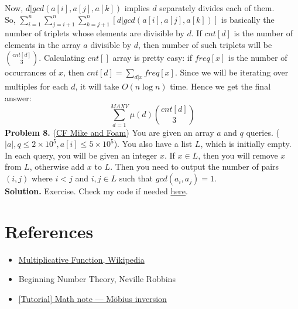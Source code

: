 \documentclass[11pt]{article}
\begin{document}
Now, $d | gcd(a[i], a[j], a[k])$ implies $d$ separately divides each of them.\\ So, $\sum_{i = 1}^{n} \sum_{j = i + 1}^{n} \sum_{k = j + 1}^{n} [d | gcd(a[i], a[j], a[k])]$ is basically the number of triplets whose elements are divisible by $d$. If $cnt[d]$ is the number of elements in the array $a$ divisible by $d$, then number of such triplets will be $\binom{cnt[d]}{3}$. Calculating $cnt[]$ array is pretty easy: if $freq[x]$ is the number of occurrances of $x$, then $cnt[d] = \sum_{d | x} freq[x]$. Since we will be iterating over multiples for each $d$, it will take $O(n \log n)$ time. Hence we get the final answer:
$$\sum_{d = 1}^{MAXV} \mu(d) \binom{cnt[d]}{3}$$
\textbf{Problem 8.} (\href{https://codeforces.com/contest/547/problem/C}{CF Mike and Foam}) You are given an array $a$ and $q$ queries. ($|a|, q \leq 2 \times 10^5, a[i] \leq 5 \times 10^5$). You also have a list $L$, which is initially empty. In each query, you will be given an integer $x$. If $x \in L$, then you will remove $x$ from $L$, otherwise add $x$ to $L$. Then you need to output the number of pairs $(i, j)$ where $i < j$ and $i, j \in L$ such that $gcd(a_i, a_j) = 1$.\\
\textbf{Solution. } Exercise. Check my code if needed \href{https://codeforces.com/contest/547/submission/230499666}{here}.
\section*{References}
\begin{itemize}
  \item \href{https://en.wikipedia.org/wiki/Multiplicative_function}{Multiplicative Function, Wikipedia}
  \item Beginning Number Theory, Neville Robbins
  \item \href{https://codeforces.com/blog/entry/53925}{[Tutorial] Math note — Möbius inversion}
\end{itemize}
\end{document}
